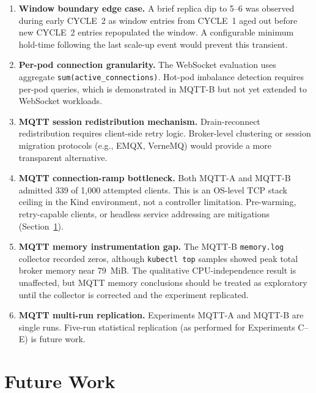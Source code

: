 \documentclass[twocolumn]{svjour3}
\begin{document}
\begin{enumerate}[leftmargin=*]
\item \textbf{Window boundary edge case.} A brief replica dip to 5--6 was observed during
early CYCLE~2 as window entries from CYCLE~1 aged out before new CYCLE~2 entries
repopulated the window. A configurable minimum hold-time following the last scale-up event
would prevent this transient.

\item \textbf{Per-pod connection granularity.} The WebSocket evaluation uses aggregate
\texttt{sum(active\_connections)}. Hot-pod imbalance detection requires per-pod queries,
which is demonstrated in MQTT-B but not yet extended to WebSocket workloads.

\item \textbf{MQTT session redistribution mechanism.} Drain-reconnect redistribution
requires client-side retry logic. Broker-level clustering or session migration protocols
(e.g., EMQX, VerneMQ) would provide a more transparent alternative.

\item \textbf{MQTT connection-ramp bottleneck.} Both MQTT-A and MQTT-B admitted 339
of 1{,}000 attempted clients. This is an OS-level TCP stack ceiling in the Kind environment, not
a controller limitation. Pre-warming, retry-capable clients, or headless service addressing
are mitigations (Section~\ref{sec:future_work}).

\item \textbf{MQTT memory instrumentation gap.} The MQTT-B \texttt{memory.log} collector
recorded zeros, although \texttt{kubectl top} samples showed peak total broker memory near
79~MiB. The qualitative CPU-independence result is unaffected, but MQTT memory
conclusions should be treated as exploratory until the collector is corrected and the
experiment replicated.

\item \textbf{MQTT multi-run replication.} Experiments MQTT-A and MQTT-B are single
runs. Five-run statistical replication (as performed for Experiments C--E) is future work.

\end{enumerate}



\section{Future Work}
\label{sec:future_work}
\end{document}
